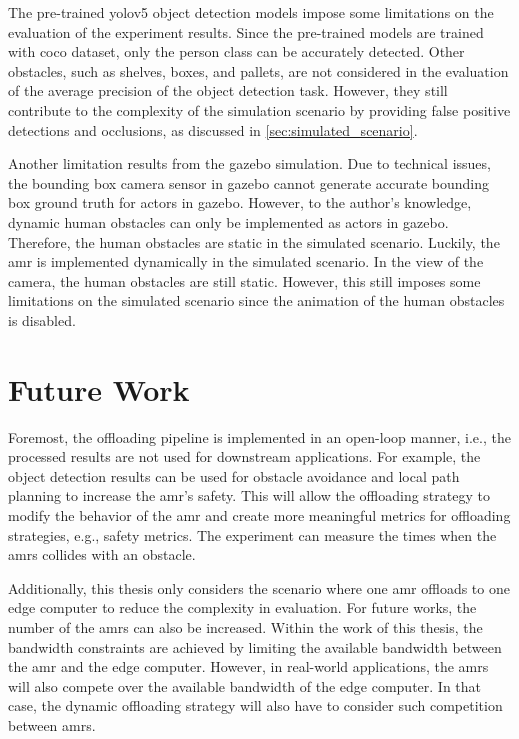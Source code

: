 The pre-trained \gls{yolo}v5 object detection models impose some limitations on the evaluation of the experiment results. Since the pre-trained models are trained with \gls{coco} dataset, only the person class can be accurately detected. Other obstacles, such as shelves, boxes, and pallets, are not considered in the evaluation of the average precision of the object detection task. However, they still contribute to the complexity of the simulation scenario by providing false positive detections and occlusions, as discussed in \cref{sec:simulated_scenario}. 

Another limitation results from the \gls{gazebo} simulation. Due to technical issues, the bounding box camera sensor in \gls{gazebo} cannot generate accurate bounding box ground truth for actors in \gls{gazebo}. However, to the author's knowledge, dynamic human obstacles can only be implemented as actors in \gls{gazebo}. Therefore, the human obstacles are static in the simulated scenario. Luckily, the \gls{amr} is implemented dynamically in the simulated scenario. In the view of the camera, the human obstacles are still static. However, this still imposes some limitations on the simulated scenario since the animation of the human obstacles is disabled. 

\section{Future Work}\label{sec:future_works}

Foremost, the offloading pipeline is implemented in an open-loop manner, i.e., the processed results are not used for downstream applications. For example, the object detection results can be used for obstacle avoidance and local path planning to increase the \gls{amr}'s safety. This will allow the offloading strategy to modify the behavior of the \gls{amr} and create more meaningful metrics for offloading strategies, e.g., safety metrics. The experiment can measure the times when the \glspl{amr} collides with an obstacle. 

Additionally, this thesis only considers the scenario where one \gls{amr} offloads to one edge computer to reduce the complexity in evaluation. For future works, the number of the \glspl{amr} can also be increased. Within the work of this thesis, the bandwidth constraints are achieved by limiting the available bandwidth between the \gls{amr} and the edge computer. However, in real-world applications, the \glspl{amr} will also compete over the available bandwidth of the edge computer. In that case, the dynamic offloading strategy will also have to consider such competition between \glspl{amr}.


